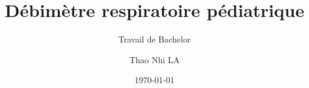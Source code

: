 \author{Thao Nhi LA}


\title{Débimètre respiratoire pédiatrique} %

\subtitle{Travail de Bachelor}


\date{\today}


